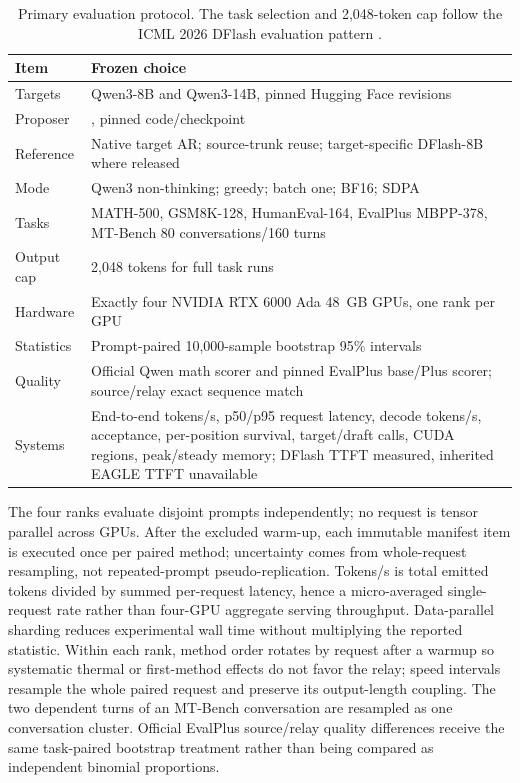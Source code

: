 \documentclass[10pt]{article}
\newcommand{\code}[1]{\texttt{\detokenize{#1}}}
\begin{document}
\begin{table}[H]
\centering
\small
\begin{tabularx}{\linewidth}{@{}lX@{}}
\toprule
Item & Frozen choice \\
\midrule
Targets & Qwen3-8B and Qwen3-14B, pinned Hugging Face revisions \\
Proposer & \code{z-lab/Qwen3-4B-DFlash-b16}, pinned code/checkpoint \\
Reference & Native target AR; source-trunk reuse; target-specific DFlash-8B where released \\
Mode & Qwen3 non-thinking; greedy; batch one; BF16; SDPA \\
Tasks & MATH-500, GSM8K-128, HumanEval-164, EvalPlus MBPP-378, MT-Bench 80 conversations/160 turns \\
Output cap & 2,048 tokens for full task runs \\
Hardware & Exactly four NVIDIA RTX 6000 Ada 48~GB GPUs, one rank per GPU \\
Statistics & Prompt-paired 10,000-sample bootstrap 95\% intervals \\
Quality & Official Qwen math scorer and pinned EvalPlus base/Plus scorer; source/relay exact sequence match \\
Systems & End-to-end tokens/s, p50/p95 request latency, decode tokens/s, acceptance, per-position survival, target/draft calls, CUDA regions, peak/steady memory; DFlash TTFT measured, inherited EAGLE TTFT unavailable \\
\bottomrule
\end{tabularx}
\caption{Primary evaluation protocol. The task selection and 2,048-token cap
follow the ICML 2026 DFlash evaluation pattern \cite{chen2026dflash}.}
\end{table}

The four ranks evaluate disjoint prompts independently; no request is tensor
parallel across GPUs. After the excluded warm-up, each immutable manifest item
is executed once per paired method; uncertainty comes from whole-request
resampling, not repeated-prompt pseudo-replication. Tokens/s is total emitted tokens divided by summed
per-request latency, hence a micro-averaged single-request rate rather than
four-GPU aggregate serving throughput. Data-parallel sharding reduces
experimental wall time without multiplying the reported statistic. Within
each rank, method order rotates by request after a warmup so systematic thermal
or first-method effects do not favor the relay; speed intervals resample the
whole paired request and preserve its output-length coupling. The two
dependent turns of an MT-Bench conversation are resampled as one conversation
cluster. Official EvalPlus source/relay quality differences receive the same
task-paired bootstrap treatment rather than being compared as independent
binomial proportions.
\end{document}
